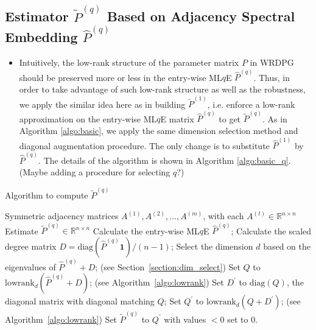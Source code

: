 \documentclass[a4paper]{article}
\renewcommand{\hat}{\widehat}
\begin{document}
\subsection{Estimator $\widetilde{P}^{(q)}$ Based on Adjacency Spectral Embedding $\hat{P}^{(q)}$}
\begin{itemize}
\item Intuitively, the low-rank structure of the parameter matrix $P$ in WRDPG should be preserved more or less in the entry-wise ML$q$E $\hat{P}^{(q)}$. Thus, in order to take advantage of such low-rank structure as well as the robustness, we apply the similar idea here as in building $\widetilde{P}^{(1)}$, i.e. enforce a low-rank approximation on the entry-wise ML$q$E matrix $\hat{P}^{(q)}$ to get $\widetilde{P}^{(q)}$. As in Algorithm \ref{algo:basic}, we apply the same dimension selection method and diagonal augmentation procedure. The only change is to substitute $\hat{P}^{(1)}$ by $\hat{P}^{(q)}$. The details of the algorithm is shown in Algorithm \ref{algo:basic_q}.
(Maybe adding a procedure for selecting $q$?)
\end{itemize}

\begin{algorithm}[H]
\caption{Algorithm to compute $\widetilde{P}^{(q)}$}
\label{algo:basic_q}
\begin{algorithmic}[1]
\REQUIRE Symmetric adjacency matrices $A^{(1)}, A^{(2)}, \dotsc, A^{(m)}$, with each $A^{(t)} \in \mathbb{R}^{n \times n}$
\ENSURE Estimate $\widetilde{P}^{(q)} \in \mathbb{R}^{n \times n}$
\STATE Calculate the entry-wise ML$q$E $\hat{P}^{(q)}$;
\STATE Calculate the scaled degree matrix $D = \mathrm{diag}(\hat{P}^{(q)} \bm{1})/(n-1)$;
\STATE Select the dimension $d$ based on the eigenvalues of $\hat{P}^{(q)} + D$; (see Section~\ref{section:dim_select})
\STATE Set $Q$ to $\mathrm{lowrank}_d(\hat{P}^{(q)} + D)$; (see Algorithm~\ref{algo:lowrank})
\STATE Set $D^{\prime}$ to $ \mathrm{diag}(Q)$, the diagonal matrix with diagonal matching $Q$; 
\STATE Set $Q^{\prime}$ to $\mathrm{lowrank}_d(Q + D^{\prime})$; (see Algorithm~\ref{algo:lowrank})
\STATE Set $\widetilde{P}^{(q)}$ to $Q^{\prime}$ with values $<0$ set to $0$.
\end{algorithmic}
\end{algorithm}

\end{document}
